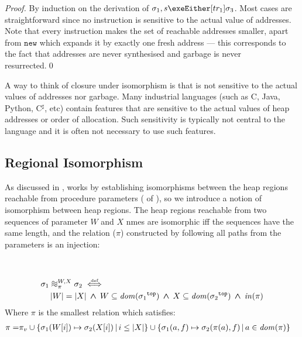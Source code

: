 \documentclass[runningheads,a4paper]{llncs}
\DeclareMathOperator{\band}{\bm{\;\land\;}}
\newcommand*{\domain}[1]{\mathit{dom}(#1)}
\newcommand*{\cardinality}[1]{\left|{#1}\right|}
\newcommand*{\defiff}{\stackrel{\text{\tiny def}}{\iff}}
\newcommand*{\setcomp}[2]{\left\{#1\,\middle|\,#2\right\}}
\newcommand*{\news}{\texttt{new}}
\newcommand{\tr}{tr}
\newcommand*{\bijection}[1]{\mathit{in}{\left(#1\right)}}
\newcommand*{\wiso}{%
  \mathrel{\vcenter{\offinterlineskip
  \hbox{$\sim$}\vskip-.35ex\hbox{$\sim$}\vskip-.35ex\hbox{$\sim$}}}}
\newcommand*{\store}{\sigma}
\newcommand*{\topof}[1]{{#1}^{\mathtt{top}}}
\newcommand{\ncui}{closure under isomorphism}
\begin{document}
\begin{proof}By induction on the derivation of $\store_1,s\exeEither[\tr_1]\store_3$. Most cases are straightforward since no instruction is sensitive to the actual value of addresses. Note that every instruction makes the set of reachable addresses smaller, apart from $\news$ which expands it by exactly one fresh address --- this corresponds to the fact that addresses are never synthesised and garbage is never resurrected.\qed\end{proof}

A way to think of \ncui{} is that \lang{} is not sensitive to the actual values of addresses nor garbage. Many industrial languages (such as C, Java, Python, C$^\sharp$, etc) contain features that are sensitive to the actual values of heap addresses or order of allocation. Such sensitivity is typically not central to the language and it is often not necessary to use such features.

\subsection{Regional Isomorphism}

As discussed in , \Tool{} works by establishing isomorphisms between the heap regions reachable from procedure parameters ( of ), so we introduce a notion of isomorphism between heap regions. The heap regions reachable from two sequences of parameter $W$ and $X$ nmes are isomorphic iff the sequences have the same length, and the relation ($\pi$) constructed by following all paths from the parameters is an injection:

\begin{definition}\label{def:regional isomorphism}\setlength{\parindent}{0cm}~

\[\begin{aligned}
&	\store_1\wiso_{\pi}^{W,X}\store_2 \defiff \\
&\quad	\cardinality{W} = \cardinality{X} \band W \subseteq \domain{\topof{\store_1}} \band X \subseteq \domain{\topof{\store_2}} \band \bijection{\pi}
\end{aligned}\]
	Where $\pi$ is the smallest relation which satisfies:
		\[\begin{aligned}
		   \pi = &\piv \cup
		   \setcomp{\store_1(W[i])\mapsto\store_2(X[i])}{i \le \cardinality{X}} \cup
		   \setcomp{\store_1(a,f)\mapsto\store_2(\pi(a),f)}{a \in \domain{\pi}}
		\end{aligned}\]
\end{definition}
\end{document}
